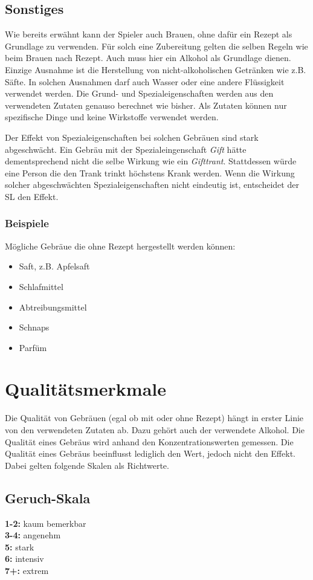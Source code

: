 \subsection{Sonstiges}
Wie bereits erwähnt kann der Spieler auch Brauen, ohne dafür ein Rezept als Grundlage zu verwenden. Für solch eine Zubereitung gelten die selben Regeln wie beim Brauen nach Rezept. Auch muss hier ein Alkohol als Grundlage dienen. Einzige Ausnahme ist die Herstellung von nicht-alkoholischen Getränken wie z.B. Säfte. In solchen Ausnahmen darf auch Wasser oder eine andere Flüssigkeit verwendet werden. Die Grund- und Spezialeigenschaften werden aus den verwendeten Zutaten genauso berechnet wie bisher. Als Zutaten können nur spezifische Dinge und keine Wirkstoffe verwendet werden.

Der Effekt von Spezialeigenschaften bei solchen Gebräuen sind stark abgeschwächt. Ein Gebräu mit der Spezialeingenschaft \textit{Gift} hätte dementsprechend nicht die selbe Wirkung wie ein \textit{Gifttrant}. Stattdessen würde eine Person die den Trank trinkt höchstens Krank werden. Wenn die Wirkung solcher abgeschwächten Spezialeigenschaften nicht eindeutig ist, entscheidet der SL den Effekt.

\subsubsection{Beispiele}
Mögliche Gebräue die ohne Rezept hergestellt werden können: 
\begin{itemize}
	\item Saft, z.B. Apfelsaft
	\item Schlafmittel
	\item Abtreibungsmittel
	\item Schnaps
	\item Parfüm
\end{itemize}


\section{Qualitätsmerkmale}
Die Qualität von Gebräuen (egal ob mit oder ohne Rezept) hängt in erster Linie von den verwendeten Zutaten ab. Dazu gehört auch der verwendete Alkohol. Die Qualität eines Gebräus wird anhand den Konzentrationswerten gemessen. Die Qualität eines Gebräus beeinflusst lediglich den Wert, jedoch nicht den Effekt. Dabei gelten folgende Skalen als Richtwerte. 

\subsection{Geruch-Skala}
\textbf{1-2:} kaum bemerkbar \\
\textbf{3-4:} angenehm \\
\textbf{5:} stark \\
\textbf{6:} intensiv \\
\textbf{7+:} extrem 

